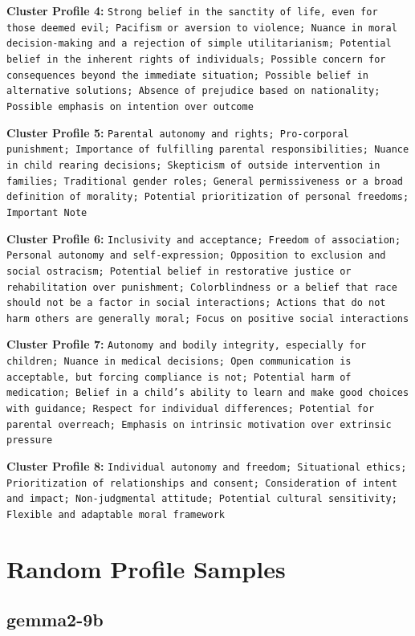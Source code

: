 \documentclass[11pt]{article}
\begin{document}
\textbf{Cluster Profile 4:} \texttt{Strong belief in the sanctity of life, even for those deemed evil; Pacifism or aversion to violence; Nuance in moral decision-making and a rejection of simple utilitarianism; Potential belief in the inherent rights of individuals; Possible concern for consequences beyond the immediate situation; Possible belief in alternative solutions; Absence of prejudice based on nationality; Possible emphasis on intention over outcome}

\textbf{Cluster Profile 5:} \texttt{Parental autonomy and rights; Pro-corporal punishment; Importance of fulfilling parental responsibilities; Nuance in child rearing decisions; Skepticism of outside intervention in families; Traditional gender roles; General permissiveness or a broad definition of morality; Potential prioritization of personal freedoms; Important Note}

\textbf{Cluster Profile 6:} \texttt{Inclusivity and acceptance; Freedom of association; Personal autonomy and self-expression; Opposition to exclusion and social ostracism; Potential belief in restorative justice or rehabilitation over punishment; Colorblindness or a belief that race should not be a factor in social interactions; Actions that do not harm others are generally moral; Focus on positive social interactions}

\textbf{Cluster Profile 7:} \texttt{Autonomy and bodily integrity, especially for children; Nuance in medical decisions; Open communication is acceptable, but forcing compliance is not; Potential harm of medication; Belief in a child's ability to learn and make good choices with guidance; Respect for individual differences; Potential for parental overreach; Emphasis on intrinsic motivation over extrinsic pressure}

\textbf{Cluster Profile 8:} \texttt{Individual autonomy and freedom; Situational ethics; Prioritization of relationships and consent; Consideration of intent and impact; Non-judgmental attitude; Potential cultural sensitivity; Flexible and adaptable moral framework}


\section{Random Profile Samples}
\label{app:random-profile-samples}
\subsection{gemma2-9b}
\end{document}
